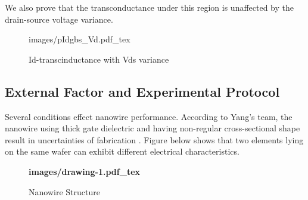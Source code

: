 We also prove that the transconductance under this region is unaffected by the drain-source voltage variance.

\begin{figure}[!htbp]
    \centering
        \def\svgwidth{10cm}
        \fontsize{10}{20}\selectfont
         {images/pIdgbs_Vd.pdf_tex}
    \fontsize{6}{7}\selectfont
    \caption{Id-transcinductance with Vds variance}
    \label{fig:res}
\end{figure}











\subsection{External Factor and Experimental Protocol}
Several conditions effect nanowire performance.
According to Yang's team, the nanowire using thick gate dielectric and having non-regular cross-sectional
shape result in uncertainties of fabrication \cite{C6}.
Figure below shows that two elements lying on the same wafer can exhibit different electrical characteristics.

\begin{figure}[!htbp]
    \centering
    {\selectfont\textbf{
        \def\svgwidth{5.0cm}
        \fontsize{6}{7}\selectfont
         {images/drawing-1.pdf_tex}
    }}
    \fontsize{6}{7}\selectfont
    \caption{Nanowire Structure}
    \label{fig:res}
\end{figure}

 

